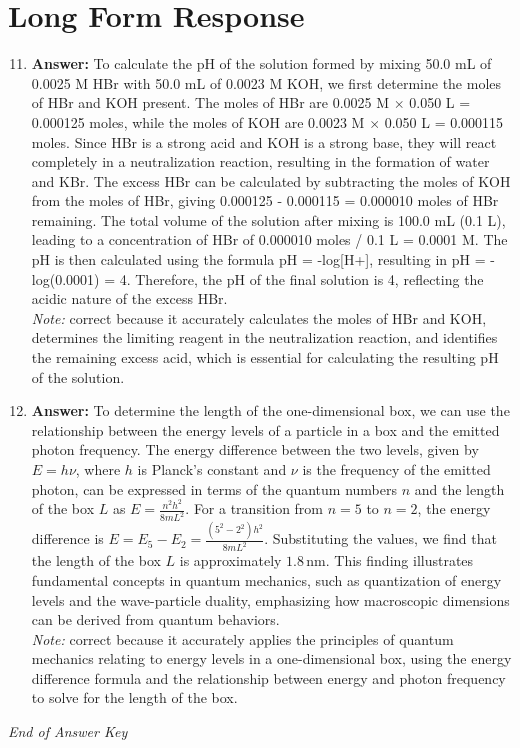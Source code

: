 \documentclass[12pt]{article}
\begin{document}
\section*{Long Form Response}
\begin{enumerate}[label=\arabic*.]
\setcounter{enumi}{10}
\item \textbf{Answer:} To calculate the pH of the solution formed by mixing 50.0 mL of 0.0025 M HBr with 50.0 mL of 0.0023 M KOH, we first determine the moles of HBr and KOH present. The moles of HBr are 0.0025 M \ensuremath{\times} 0.050 L = 0.000125 moles, while the moles of KOH are 0.0023 M \ensuremath{\times} 0.050 L = 0.000115 moles. Since HBr is a strong acid and KOH is a strong base, they will react completely in a neutralization reaction, resulting in the formation of water and KBr. The excess HBr can be calculated by subtracting the moles of KOH from the moles of HBr, giving 0.000125 - 0.000115 = 0.000010 moles of HBr remaining. The total volume of the solution after mixing is 100.0 mL (0.1 L), leading to a concentration of HBr of 0.000010 moles / 0.1 L = 0.0001 M. The pH is then calculated using the formula pH = -log[H+], resulting in pH = -log(0.0001) = 4. Therefore, the pH of the final solution is 4, reflecting the acidic nature of the excess HBr.
\\ \textit{Note:} correct because it accurately calculates the moles of HBr and KOH, determines the limiting reagent in the neutralization reaction, and identifies the remaining excess acid, which is essential for calculating the resulting pH of the solution.
\item \textbf{Answer:} To determine the length of the one-dimensional box, we can use the relationship between the energy levels of a particle in a box and the emitted photon frequency. The energy difference between the two levels, given by \(E = h \nu\), where \(h\) is Planck's constant and \(\nu\) is the frequency of the emitted photon, can be expressed in terms of the quantum numbers \(n\) and the length of the box \(L\) as \(E = \frac{n^2 h^2}{8 mL^2}\). For a transition from \(n=5\) to \(n=2\), the energy difference is \(E = E_5 - E_2 = \frac{(5^2 - 2^2)h^2}{8 mL^2}\). Substituting the values, we find that the length of the box \(L\) is approximately \(1.8 \, \text{nm}\). This finding illustrates fundamental concepts in quantum mechanics, such as quantization of energy levels and the wave-particle duality, emphasizing how macroscopic dimensions can be derived from quantum behaviors.
\\ \textit{Note:} correct because it accurately applies the principles of quantum mechanics relating to energy levels in a one-dimensional box, using the energy difference formula and the relationship between energy and photon frequency to solve for the length of the box.
\end{enumerate}

\vfill
\noindent\textit{End of Answer Key}
\end{document}
